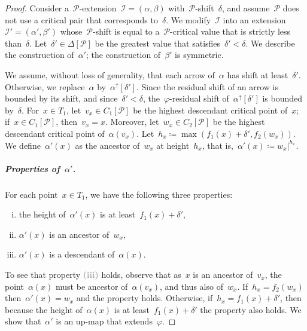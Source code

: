 \documentclass[a4paper,UKenglish, autoref, thm-restate, cleveref]{lipics-v2021}
\newcommand{\an}[2]{#1|^{#2}}
\renewcommand{\phi}{\varphi}
\newcommand{\I}{\mathcal{I}}
\renewcommand{\P}{\mathcal{P}}
\newcommand{\enumit}[1]{\textcolor{darkgray}{\sffamily\bfseries\upshape\mathversion{bold}#1}}
\begin{document}
\begin{proof}
Consider a~$\P$-extension~$\I = (\alpha, \beta)$ with~$\P$-shift~$\delta$, and assume~$\P$ does not use a critical pair that corresponds to~$\delta$.
We modify~$\I$ into an extension~$\I' = (\alpha', \beta')$ whose~$\P$-shift is equal to a~$\P$-critical value that is strictly less than~$\delta$.
Let~$\delta' \in \Delta[\P]$ be the greatest value that satisfies~$\delta' < \delta$.
We describe the construction of~$\alpha'$; the construction of~$\beta'$ is symmetric.

We assume, without loss of generality, that each arrow of~$\alpha$ has shift at least~$\delta'$.
Otherwise, we replace~$\alpha$ by~$\alpha^\uparrow[\delta']$.
Since the residual shift of an arrow is bounded by its shift, and since~$\delta' < \delta$, the~$\phi$-residual shift of~$\alpha^\uparrow[\delta']$ is bounded by~$\delta$.
For~$x \in T_1$, let~$v_x \in C_1[\P]$ be the highest descendant critical point of~$x$; if~$x \in C_1[\P]$, then~$v_x = x$.
Moreover, let~$w_x \in C_2[\P]$ be the highest descendant critical point of~$\alpha(v_x)$.
Let~$h_x \coloneqq \max(f_1(x) + \delta', f_2(w_x))$.
We define~$\alpha'(x)$ as the ancestor of~$w_x$ at height~$h_x$, that is,~$\alpha'(x) \coloneqq \an{w_x}{h_x}$.

\subparagraph*{Properties of~$\alpha'$.}
For each point~$x \in T_1$, we have the following three properties:
\begin{enumerate}[(i)]
    \item the height of~$\alpha'(x)$ is at least~$f_1(x) + \delta'$,
    \item $\alpha'(x)$ is an ancestor of~$w_x$,
    \item $\alpha'(x)$ is a descendant of~$\alpha(x)$.
\end{enumerate}
To see that property \enumit{(iii)} holds, observe that as~$x$ is an ancestor of~$v_x$, the point~$\alpha(x)$ must be ancestor of~$\alpha(v_x)$, and thus also of~$w_x$.
If~$h_x = f_2(w_x)$ then~$\alpha'(x) = w_x$ and the property holds.
Otherwise, if~$h_x = f_1(x) + \delta'$, then because the height of~$\alpha(x)$ is at least~$f_1(x) + \delta'$ the property also holds.
We show that~$\alpha'$ is an up-map that extends~$\phi$.


\end{proof}
\end{document}

